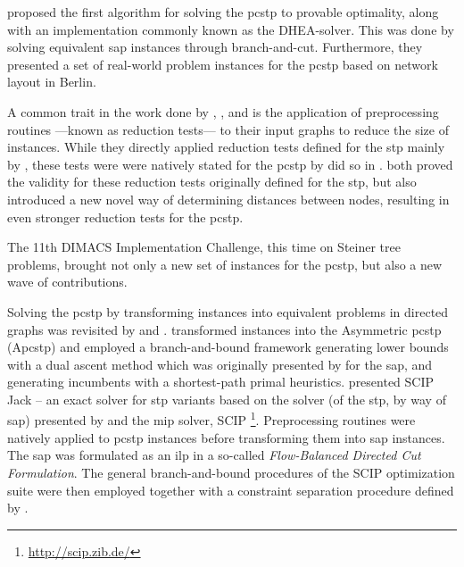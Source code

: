  \citet{ljubic2005solving} proposed the first algorithm for solving the \gls{pcstp} to provable optimality, along with an
 implementation commonly known as the DHEA-solver.
 This was done by solving
 equivalent \gls{sap} instances through branch-and-cut.
 Furthermore, they presented a set of real-world problem instances for the \gls{pcstp} based on network layout in Berlin.

 A common trait in the work done by
 \citet{lucena2004strong}, \citet{Ljubic:2004:memetic}, and \citet{ljubic2005solving}
 is the application of preprocessing routines
  ---known as reduction tests--- to their input graphs to reduce the size of instances.
  While they directly applied reduction tests
  defined for the \gls{stp} mainly by \citet{duin1989edge,duin1989reduction},
  these tests were were natively stated for the \gls{pcstp}
  by \citet{uchoa2006reduction} did so in \citeyear{uchoa2006reduction}.
  \citeauthor{uchoa2006reduction} both proved the validity
  for these reduction tests originally defined for the \gls{stp},
  but also introduced a new
  novel way of determining distances between nodes, resulting in
  even stronger reduction tests for the \gls{pcstp}.

  The 11th DIMACS Implementation Challenge\citep{DIMACS}, this time on Steiner tree problems,
  brought not only a new set of instances for the \gls{pcstp}, but
  also a new wave of contributions.

  Solving the \gls{pcstp} by transforming instances into equivalent problems in directed graphs
  was revisited by \citet{leitner2016dual} and \citet{gamrath2017scip}.
  \citet{leitner2016dual} transformed instances into the Asymmetric \gls{pcstp} (A\gls{pcstp})
  and employed a
  branch-and-bound framework generating lower bounds with a dual ascent method which was originally presented by \citet{wong1984dual} for the \gls{sap}, and
  generating incumbents with
  a shortest-path primal heuristics.
  \citet{gamrath2017scip} presented SCIP Jack -- an exact solver for \gls{stp} variants based on the solver (of the \gls{stp}, by way of \gls{sap}) presented by
  \citet{koch1998solving} and the \gls{mip} solver, SCIP \footnote{\url{http://scip.zib.de/}}\citep{GleixnerEtal2017OO}.
  Preprocessing routines were natively applied to \gls{pcstp} instances before transforming them into \gls{sap} instances.
  The \gls{sap} was formulated as an
  \gls{ilp} in a so-called \textit{Flow-Balanced Directed Cut Formulation}. The general branch-and-bound
  procedures of the SCIP optimization suite were
  then employed together with a constraint separation procedure defined by \citet{koch1998solving}.

